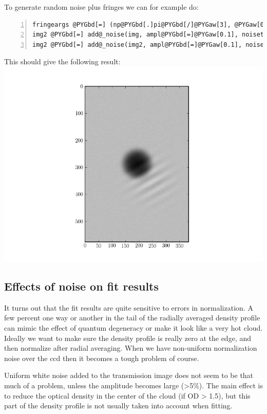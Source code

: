 \documentclass[letterpaper,10pt,english]{manual}
\begin{document}
To generate random noise plus fringes we can for example do:

\begin{Verbatim}[commandchars=@\[\],numbers=left,firstnumber=1,stepnumber=1]
fringeargs @PYGbd[=] (np@PYGbd[.]pi@PYGbd[/]@PYGaw[3], @PYGaw[0.03], (@PYGaw[60], @PYGaw[50]), @PYGaw[70])
img2 @PYGbd[=] add@_noise(img, ampl@PYGbd[=]@PYGaw[0.1], noisetype@PYGbd[=]@PYGaB[']@PYGaB[fringes]@PYGaB['], fringeargs@PYGbd[=]fringeargs)
img2 @PYGbd[=] add@_noise(img2, ampl@PYGbd[=]@PYGaw[0.1], noisetype@PYGbd[=]@PYGaB[']@PYGaB[random]@PYGaB['])
\end{Verbatim}

This should give the following result:
\includegraphics[width=400pt]{noisy_image.png}

\subsection{Effects of noise on fit results}

It turns out that the fit results are quite sensitive to errors in normalization. A few percent one way or another in the tail of the radially averaged density profile can mimic the effect of quantum degeneracy or make it look like a very hot cloud. Ideally we want to make sure the density profile is really zero at the edge, and then normalize after radial averaging. When we have non-uniform normalization noise over the ccd then it becomes a tough problem of course.

Uniform white noise added to the transmission image does not seem to be that much of a problem, unless the amplitude becomes large (\textgreater{}5\%). The main effect is to reduce the optical density in the center of the cloud (if OD \textgreater{} 1.5), but this part of the density profile is not usually taken into account when fitting.
\hypertarget{radialaveraging-label}{}
\end{document}
